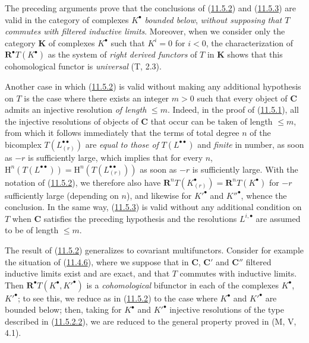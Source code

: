 \begin{remark}[11.5.4]
\label{0.11.5.4}
The preceding arguments prove that the conclusions of
(\hyperref[0.11.5.2]{11.5.2}) and
(\hyperref[0.11.5.3]{11.5.3}) are valid in the category of
complexes $K^\bullet$ \emph{bounded below}, \emph{without supposing that $T$
commutes with filtered inductive limits}. Moreover, when we consider
only the category $\boldsymbol{K}$ of complexes $K^\bullet$ such that
$K^i=0$ for $i<0$, the characterization of $\mathbf R^\bullet T(K^\bullet)$
as the system of \emph{right derived functors} of $T$ in $\boldsymbol{K}$
shows that this cohomological functor is \emph{universal} (T, 2.3).

Another case in which (\hyperref[0.11.5.2]{11.5.2}) is valid without making
any additional hypothesis on $T$ is the case where there exists an integer $m>0$
such that every object of $\boldsymbol{C}$ admits an injective resolution \emph{of length}
$\leq m$. Indeed, in the proof of
(\hyperref[0.11.5.1]{11.5.1}), all the injective resolutions of objects
of $\boldsymbol{C}$ that occur can be taken of length $\leq m$,
from which it follows immediately that the terms of total degree $n$ of the bicomplex
$T(L_{(r)}^{\bullet\bullet})$ are \emph{equal to those of}
$T(L^{\bullet\bullet})$ and \emph{finite} in number, as soon as $-r$ is sufficiently large, which
implies that for every $n$,
$\mathrm H^n(T(L^{\bullet\bullet}))=
\mathrm H^n(T(L_{(r)}^{\bullet\bullet}))$ as soon as $-r$ is sufficiently large. With
the notation of (\hyperref[0.11.5.2]{11.5.2}), we therefore also have
$\mathbf R^nT(K_{(r)}^\bullet)=\mathbf R^nT(K^\bullet)$ for $-r$ sufficiently large
(depending on $n$), and likewise for $K'^\bullet$ and $K''^\bullet$, whence the
conclusion. In the same way, (\hyperref[0.11.5.3]{11.5.3}) is valid
without any additional condition on $T$ when $\boldsymbol{C}$ satisfies
the preceding hypothesis and the resolutions
$L^{i,\bullet}$ are assumed to be of length $\leq m$.
\end{remark}

\begin{env}[11.5.5]
\label{0.11.5.5}
The result of (\hyperref[0.11.5.2]{11.5.2}) generalizes to
covariant multifunctors. Consider for example the situation of
(\hyperref[0.11.4.6]{11.4.6}), where we suppose that in $\boldsymbol{C}$,
$\boldsymbol{C}'$ and $\boldsymbol{C}''$
filtered inductive limits exist and are exact, and that $T$ commutes
with inductive limits. Then $\mathbf R^\bullet T(K^\bullet,K'^\bullet)$ is
a \emph{cohomological} bifunctor in each of the complexes $K^\bullet$,
$K'^\bullet$; to see this, we reduce as in
(\hyperref[0.11.5.2]{11.5.2}) to the case where $K^\bullet$ and $K'^\bullet$ are
bounded below; then, taking for $K^\bullet$ and $K'^\bullet$
injective resolutions of the type described in
(\hyperref[0.11.5.2.2]{11.5.2.2}), we are reduced to the general property
proved in (M, V, 4.1).
\end{env}

